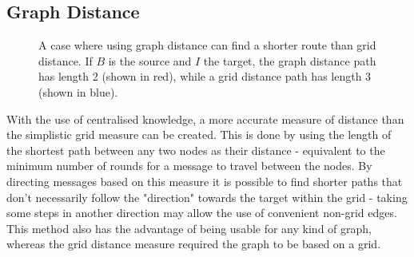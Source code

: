 \documentclass[bsc,frontabs,twoside,singlespacing,parskip,deptreport]{infthesis}     %
\begin{document}
\subsection{Graph Distance} \label{subsec:graph_dist}

\begin{figure}
\centering
{}
\caption{A case where using graph distance can find a shorter route than grid distance. If $B$ is the source and $I$ the target, the graph distance path has length 2 (shown in red), while a grid distance path has length 3 (shown in blue).}
\label{fig:graph_dist_example}
\end{figure}

With the use of centralised knowledge, a more accurate measure of distance than the simplistic grid measure can be created. This is done by using the length of the shortest path between any two nodes as their distance - equivalent to the minimum number of rounds for a message to travel between the nodes. By directing messages based on this measure it is possible to find shorter paths that don't necessarily follow the "direction" towards the target within the grid - taking some steps in another direction may allow the use of convenient non-grid edges. This method also has the advantage of being usable for any kind of graph, whereas the grid distance measure required the graph to be based on a grid.
\end{document}
